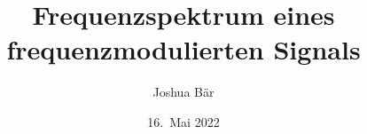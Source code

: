 %
%
%


\beamertemplatenavigationsymbolsempty
\title[FM]{Frequenzspektrum eines frequenzmodulierten Signals}
\author[Joshua Bär]{Joshua Bär}
\date[]{16.~Mai 2022}

